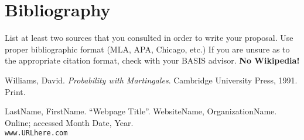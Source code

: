 
\section[Bibliography]{Bibliography}

List at least two sources that you consulted in order to write your proposal. Use proper bibliographic format (MLA, APA, Chicago, etc.) If you are unsure as to the appropriate citation format, check with your BASIS advisor. \textbf{No Wikipedia!}




\begin{thebibliography}{1}

    Williams, David.
    \textit{Probability with Martingales}.
    Cambridge University Press, 1991.
    Print.

  LastName, FirstName. ``Webpage Title''.
  WebsiteName, OrganizationName.
  Online; accessed Month Date, Year.\\
  \texttt{www.URLhere.com}

\end{thebibliography}